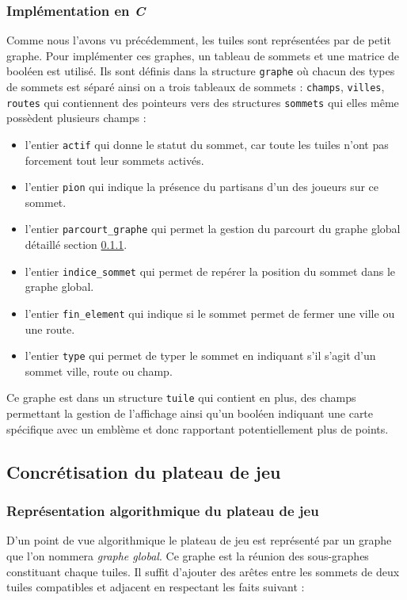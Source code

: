 \documentclass[a4paper, 11pt]{article}
\begin{document}
		\subsubsection{Implémentation en \emph{C}}\label{sec:tuiles-c}
			\indent Comme nous l'avons vu précédemment, les tuiles sont représentées par de petit graphe. Pour implémenter ces graphes, un tableau de sommets et une matrice de booléen est utilisé. Ils sont définis dans la structure \verb!graphe! où chacun des types de sommets est séparé ainsi on a trois tableaux de sommets : \verb!champs!, \verb!villes!, \verb!routes! qui contiennent des pointeurs vers des structures \verb!sommets! qui elles même possèdent plusieurs champs : 
			\begin{itemize}
				\item l'entier \verb!actif! qui donne le statut du sommet, car toute les tuiles n'ont pas forcement tout leur sommets activés. 
				\item l'entier \verb!pion! qui indique la présence du partisans d'un des joueurs sur ce sommet. 
				\item l'entier \verb!parcourt_graphe! qui permet la gestion du parcourt du graphe global détaillé section \ref{sec:plateau-algo}.
				\item l'entier \verb!indice_sommet! qui permet de repérer la position du sommet dans le graphe global.
				\item l'entier \verb!fin_element! qui indique si le sommet permet de fermer une ville ou une route.
				\item l'entier \verb!type! qui permet de typer le sommet en indiquant s'il s'agit d'un sommet ville, route ou champ.
			\end{itemize}
			Ce graphe est dans un structure \verb!tuile! qui contient en plus, des champs permettant la gestion de l'affichage ainsi qu'un booléen indiquant une carte spécifique avec un emblème et donc rapportant potentiellement plus de points.


	\subsection{Concrétisation du plateau de jeu}\label{sec:plateau}
		\subsubsection{Représentation algorithmique du plateau de jeu}\label{sec:plateau-algo}
			\indent D'un point de vue algorithmique le plateau de jeu est représenté par un graphe que l'on nommera \emph{graphe global}. Ce graphe est la réunion des sous-graphes constituant chaque tuiles. Il suffit d'ajouter des arêtes entre les sommets de deux tuiles compatibles et adjacent en respectant les faits suivant : 
\end{document}
